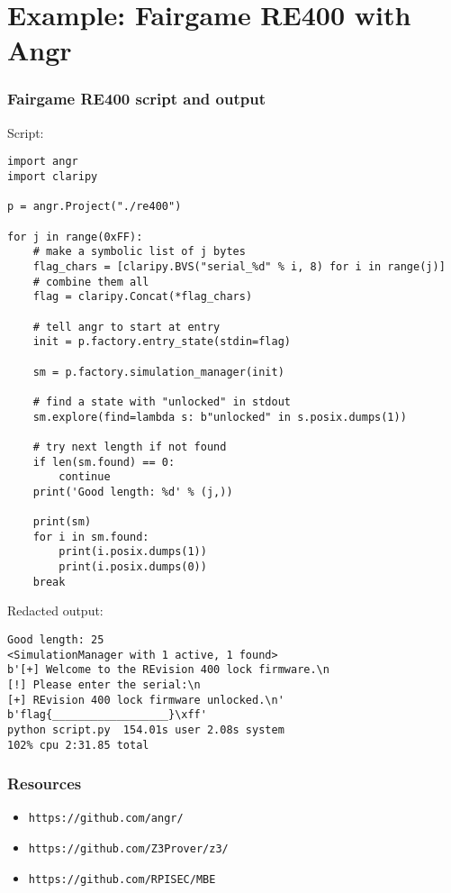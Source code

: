 \documentclass[aspectratio=169]{beamer}
\begin{document}
\section{Example: Fairgame RE400 with Angr}
\begin{frame}[fragile]
\frametitle{Fairgame RE400 script and output}
\begin{minipage}{0.55\textwidth}
Script:
\begin{Verbatim}[frame=single, fontsize=\tiny]
import angr
import claripy

p = angr.Project("./re400")

for j in range(0xFF):
    # make a symbolic list of j bytes
    flag_chars = [claripy.BVS("serial_%d" % i, 8) for i in range(j)]
    # combine them all
    flag = claripy.Concat(*flag_chars)

    # tell angr to start at entry
    init = p.factory.entry_state(stdin=flag)

    sm = p.factory.simulation_manager(init)

    # find a state with "unlocked" in stdout
    sm.explore(find=lambda s: b"unlocked" in s.posix.dumps(1))

    # try next length if not found
    if len(sm.found) == 0:
        continue
    print('Good length: %d' % (j,))

    print(sm)
    for i in sm.found:
        print(i.posix.dumps(1))
        print(i.posix.dumps(0))
    break
\end{Verbatim}
\end{minipage}
\begin{minipage}{0.44\textwidth}
Redacted output:
\begin{Verbatim}[frame=single, fontsize=\tiny]
Good length: 25
<SimulationManager with 1 active, 1 found>
b'[+] Welcome to the REvision 400 lock firmware.\n
[!] Please enter the serial:\n
[+] REvision 400 lock firmware unlocked.\n'
b'flag{__________________}\xff'
python script.py  154.01s user 2.08s system
102% cpu 2:31.85 total
\end{Verbatim}
\end{minipage}
\end{frame}


\begin{frame}[fragile]
\frametitle{Resources}
\begin{itemize}
\item \verb|https://github.com/angr/|
\item \verb|https://github.com/Z3Prover/z3/|
\item \verb|https://github.com/RPISEC/MBE|
\end{itemize}
\end{frame}
\end{document}
